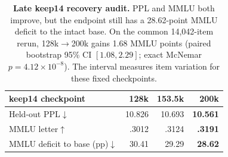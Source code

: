 \begin{table}[t]
\centering
\scriptsize
\setlength{\tabcolsep}{3.0pt}
\begin{tabular}{@{}lrrr@{}}
\toprule
\textbf{keep14 checkpoint} & \textbf{128k} & \textbf{153.5k} & \textbf{200k} \\
\midrule
Held-out PPL$\downarrow$ & 10.826 & 10.693 & \textbf{10.561} \\
MMLU letter$\uparrow$ & .3012 & .3124 & \textbf{.3191} \\
MMLU deficit to base (pp)$\downarrow$ & 30.41 & 29.29 & \textbf{28.62} \\
\bottomrule
\end{tabular}
\caption{\textbf{Late keep14 recovery audit.} PPL and MMLU both improve, but
the endpoint still has a 28.62-point MMLU deficit to the intact base. On the
common 14,042-item rerun, 128k$\rightarrow$200k gains 1.68 MMLU points
(paired bootstrap 95\% CI $[1.08,2.29]$; exact McNemar
$p=4.12{\times}10^{-8}$). The interval measures item variation for these fixed
checkpoints.}
\label{tab:trajectory-audit}
\end{table}
